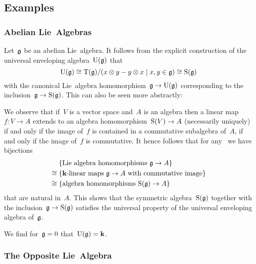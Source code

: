 \subsection{Examples}



\subsubsection{Abelian Lie~Algebras}


\begin{examples}
  Let~$\mathfrak{g}$ be an abelian Lie~algebra.
  It follows from the explicit construction of the universal enveloping algebra~$\operatorname{U}(\mathfrak{g})$ that
  \[
    \Univ(\glie)
    \cong
    \Tensor(\glie)/(x \tensor y - y \tensor x \suchthat x, y \in \glie)
    \cong
    \Symm(\glie)
  \]
  with the canonical Lie~algebra homomorphism~$\mathfrak{g} \to \operatorname{U}(\mathfrak{g})$ corresponding to the inclusion~$\mathfrak{g} \to \operatorname{S}(\mathfrak{g})$.
  This can also be seen more abstractly:
  
  We observe that if~$V$ is a vector space and~$A$ is an algebra then a linear map~$f \colon V \to A$ extends to an algebra homomorphism~$\operatorname{S}(V) \to A$ (necessarily uniquely) if and only if the image of~$f$ is contained in a commutative subalgebra of~$A$, if and only if the image of~$f$ is commutative.
  It hence follows that for any~{\algebra{$\kf$}} we have bijections
  \begin{align*}
    {}&
    \{ \text{Lie~algebra homomorphisms~$\glie \to A$} \}
    \\
    \cong{}&
    \{ \text{{\linear{$\kf$}} maps~$\glie \to A$ with commutative image} \}
    \\
    \cong{}&
    \{ \text{algebra homomorphisms~$\Symm(\glie) \to A$} \}
  \end{align*}
  that are natural in~$A$.
  This shows that the symmetric algebra~$\operatorname{S}(\mathfrak{g})$ together with the inclusion~$\mathfrak{g} \to \operatorname{S}(\mathfrak{g})$ satisfies the universal property of the universal enveloping algebra of~$\mathfrak{g}$.
\end{examples}


\begin{example}
  We find for~$\mathfrak{g} = 0$ that~$\operatorname{U}(\mathfrak{g}) = \mathbf{k}$.
\end{example}





\subsubsection{The Opposite Lie~Algebra}


